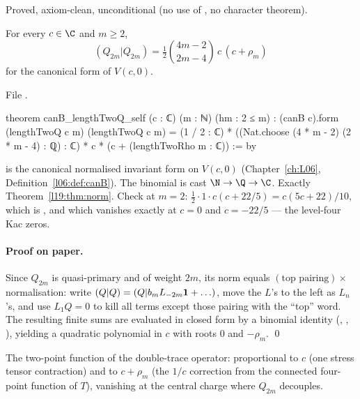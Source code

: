 \begin{status}
Proved, axiom-clean, unconditional (no use of , no character theorem).
\end{status}

\begin{theorem}\label{l19:thm:norm}
For every $c\in\C$ and $m\ge2$,
\begin{equation*}
 (Q_{2m}|Q_{2m}) = \tfrac12\binom{4m-2}{2m-4}\,c\,(c+\rho_m)
\end{equation*}
for the canonical form of $V(c,0)$.
\end{theorem}

\noindent File .
\begin{leancode}
theorem canB_lengthTwoQ_self (c : ℂ) (m : ℕ) (hm : 2 ≤ m) :
    (canB c).form (lengthTwoQ c m) (lengthTwoQ c m) =
      (1 / 2 : ℂ) * ((Nat.choose (4 * m - 2) (2 * m - 4) : ℚ) : ℂ) * c *
        (c + (lengthTwoRho m : ℂ)) := by
\end{leancode}

\begin{dictionary}
 is the canonical normalised invariant form on $V(c,0)$ (Chapter~\ref{ch:L06},
Definition~\ref{l06:def:canB}). The binomial is cast $\N\to\Q\to\C$. Exactly Theorem~\ref{l19:thm:norm}.
Check at $m=2$: $\tfrac12\cdot1\cdot c(c+22/5) = c(5c+22)/10$, which is
\allowbreak{}\allowbreak{}\allowbreak{}\allowbreak{}, and which vanishes exactly at $c=0$ and $c=-22/5$ --- the
level-four Kac zeros.
\end{dictionary}

\paragraph{Proof on paper.} Since $Q_{2m}$ is quasi-primary and of weight $2m$, its norm equals
$(\text{top pairing})\times$normalisation: write $(Q|Q) = (Q|b_mL_{-2m}\mathbf{1} + \ldots)$, move the
$L$'s to the left as $L_n$'s, and use $L_1Q=0$ to kill all terms except those pairing with the
``top'' word. The resulting finite sums are evaluated in closed form by a binomial identity
(\allowbreak{}\allowbreak{}, , ),
yielding a quadratic polynomial in $c$ with roots $0$ and $-\rho_m$. \qed

\begin{physics}
The two-point function of the double-trace operator: proportional to $c$ (one stress tensor
contraction) and to $c+\rho_m$ (the $1/c$ correction from the connected four-point function of $T$),
vanishing at the central charge where $Q_{2m}$ decouples.
\end{physics}

